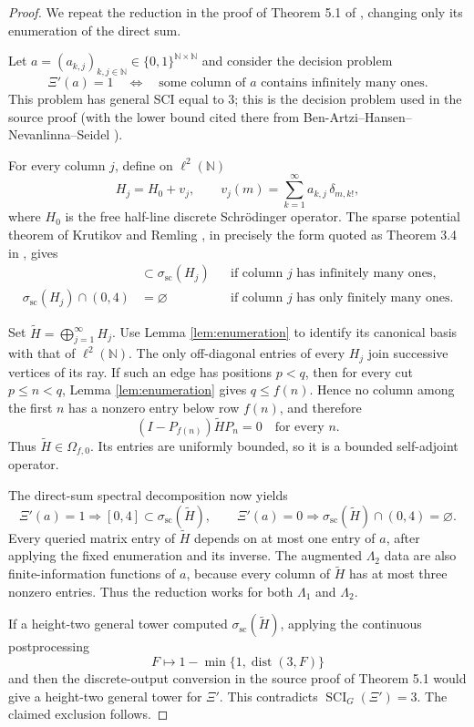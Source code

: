 \documentclass[11pt]{article}
\theoremstyle{remark}
\newcommand{\N}{\mathbb N}
\newcommand{\scspec}{\sigma_{\mathrm{sc}}}
\begin{document}
\begin{proof}
We repeat the reduction in the proof of Theorem 5.1 of \cite{Colbrook}, changing
only its enumeration of the direct sum.

Let $a=(a_{k,j})_{k,j\in\N}\in\{0,1\}^{\N\times\N}$ and consider the decision
problem
\[
 \Xi'(a)=1\quad\Longleftrightarrow\quad
 \text{some column of $a$ contains infinitely many ones}.
\]
This problem has general SCI equal to $3$; this is the decision problem used in
the source proof (with the lower bound cited there from
Ben-Artzi--Hansen--Nevanlinna--Seidel \cite{BHNS}).

For every column $j$, define on $\ell^2(\N)$
\[
 H_j=H_0+v_j,\qquad
 v_j(m)=\sum_{k=1}^{\infty}a_{k,j}\,\delta_{m,k!},
\]
where $H_0$ is the free half-line discrete Schr\"odinger operator.  The sparse
potential theorem of Krutikov and Remling \cite{KR}, in precisely the form
quoted as Theorem 3.4 in \cite{Colbrook}, gives
\begin{align*}
 [0,4]&\subset\scspec(H_j) &&\text{if column $j$ has infinitely many ones},\\
 \scspec(H_j)\cap(0,4)&=\varnothing
 &&\text{if column $j$ has only finitely many ones}.
\end{align*}

Set $\widetilde H=\bigoplus_{j=1}^{\infty}H_j$.  Use Lemma
\ref{lem:enumeration} to identify its canonical basis with that of
$\ell^2(\N)$.  The only off-diagonal entries of every $H_j$ join successive
vertices of its ray.  If such an edge has positions $p<q$, then for every cut
$p\leq n<q$, Lemma \ref{lem:enumeration} gives $q\leq f(n)$.  Hence no column
among the first $n$ has a nonzero entry below row $f(n)$, and therefore
\[
 (I-P_{f(n)})\widetilde H P_n=0
 \quad\text{for every }n.
\]
Thus $\widetilde H\in\Omega_{f,0}$.  Its entries are uniformly bounded, so it
is a bounded self-adjoint operator.

The direct-sum spectral decomposition now yields
\[
 \Xi'(a)=1\Longrightarrow [0,4]\subset\scspec(\widetilde H),
 \qquad
 \Xi'(a)=0\Longrightarrow \scspec(\widetilde H)\cap(0,4)=\varnothing.
\]
Every queried matrix entry of $\widetilde H$ depends on at most one entry of
$a$, after applying the fixed enumeration and its inverse.  The augmented
$\Lambda_2$ data are also finite-information functions of $a$, because every
column of $\widetilde H$ has at most three nonzero entries.  Thus the reduction
works for both $\Lambda_1$ and $\Lambda_2$.

If a height-two general tower computed $\scspec(\widetilde H)$, applying the
continuous postprocessing
\[
 F\longmapsto 1-\min\{1,\operatorname{dist}(3,F)\}
\]
and then the discrete-output conversion in the source proof of Theorem 5.1
would give a height-two general tower for $\Xi'$.  This contradicts
$\operatorname{SCI}_G(\Xi')=3$.  The claimed exclusion follows.
\end{proof}
\end{document}
